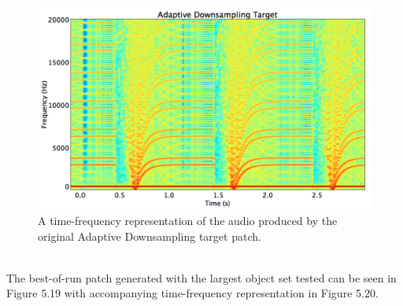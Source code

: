 \documentclass[a4paper,12pt]{report} 	%
\numberwithin{figure}{chapter}
\numberwithin{table}{chapter}
\numberwithin{equation}{chapter}
\begin{document}
\begin{flushleft}
\begin{figure}[h!]
\begin{center}
\includegraphics[scale=0.35,width=\linewidth]{AdaptiveDownsamplingTargetSTFT}
\caption[Original Adaptive Downsampling Time-Frequency Representation]{A time-frequency representation of the audio produced by the original Adaptive Downsampling target patch.}
\end{center}
\end{figure}
\\

The best-of-run patch generated with the largest object set tested can be seen in Figure 5.19 with accompanying time-frequency representation in Figure 5.20.


\end{flushleft}
\end{document}

